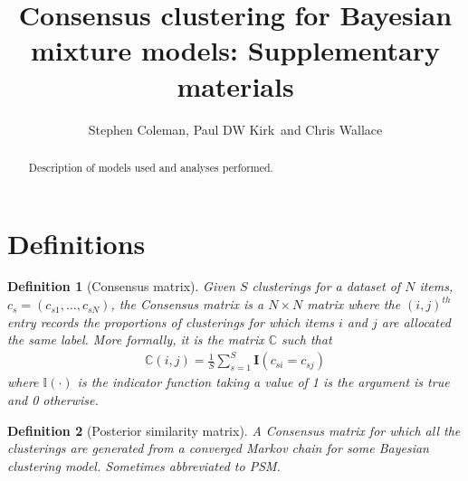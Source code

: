 \documentclass[]{article}
\title{Consensus clustering for Bayesian mixture models: Supplementary materials}
\author{Stephen Coleman, Paul DW Kirk\, and Chris Wallace}
\newtheorem{definition}{Definition}
\begin{document}
\maketitle

\begin{abstract}
Description of models used and analyses performed.
\end{abstract}


\section{Definitions}
\begin{definition}[Consensus matrix]
	Given $S$ clusterings for a dataset of $N$ items, $c_s=(c_{s1}, \ldots, c_{sN})$, the \emph{Consensus matrix} is a $N \times N$ matrix where the $(i, j )^{th}$ entry records the proportions of clusterings for which items $i$ and $j$ are allocated the same label. More formally, it is the matrix $\mathbb{C}$ such that
	\begin{align}
		\mathbb{C}(i, j) = \frac{1}{S} \sum_{s=1}^S \mathbf{I}(c_{si} = c_{sj})
	\end{align}
	where $\mathbb{I}(\cdot)$ is the indicator function taking a value of 1 is the argument is true and 0 otherwise.
\end{definition}

\begin{definition}[Posterior similarity matrix]
	A \emph{Consensus matrix} for which all the clusterings are generated from a converged Markov chain for some Bayesian clustering model. Sometimes abbreviated to \emph{PSM}.
\end{definition}
\end{document}
